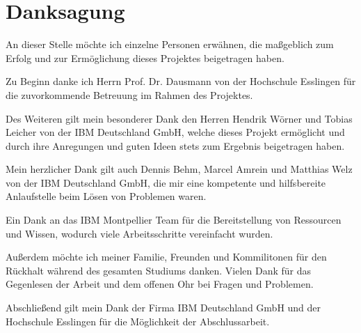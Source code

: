 \chapter*{Danksagung}
\thispagestyle{empty}

An dieser Stelle möchte ich einzelne Personen erwähnen, die maßgeblich zum Erfolg und zur Ermöglichung dieses Projektes
beigetragen haben.

Zu Beginn danke ich Herrn Prof. Dr. Dausmann von der Hochschule Esslingen für die zuvorkommende Betreuung
im Rahmen des Projektes.

Des Weiteren gilt mein besonderer Dank den Herren Hendrik Wörner und Tobias Leicher von der IBM Deutschland GmbH,
welche dieses Projekt ermöglicht und durch ihre Anregungen und guten Ideen stets zum Ergebnis beigetragen haben.

Mein herzlicher Dank gilt auch Dennis Behm, Marcel Amrein und Matthias Welz von der IBM Deutschland GmbH, die mir eine
kompetente und hilfsbereite Anlaufstelle beim Lösen von Problemen waren.

Ein Dank an das IBM Montpellier Team für die Bereitstellung von Ressourcen und Wissen, wodurch viele Arbeitsschritte
vereinfacht wurden.

Außerdem möchte ich meiner Familie, Freunden und Kommilitonen für den Rückhalt während des gesamten Studiums danken.
Vielen Dank für das Gegenlesen der Arbeit und dem offenen Ohr bei Fragen und Problemen.

Abschließend gilt mein Dank der Firma IBM Deutschland GmbH und der Hochschule Esslingen für die Möglichkeit der
Abschlussarbeit.